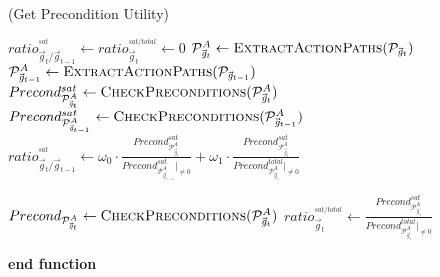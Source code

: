 \documentclass{article}
\begin{document}
\begin{algorithm}
	\caption{(Get Precondition Utility)}
	\label{array-sum}
	\begin{algorithmic}[1]
			\Statex
			\State $ratio_{{\vec{\mathit{g}}_{t}}/\vec{\mathit{g}}_{t-1}}^{^{sat}} \gets
			ratio_{\vec{\mathit{g}}_{t}}^{^{sat/total}} \gets 0$
			\Statex
			\State $\mathcal{P}_{\vec{\mathit{g}}_{t}}^A \gets \Call{ExtractActionPaths}
			{\mathcal{P}_{\vec{\mathit{g}}_{t}}}$
			\Statex
					\Statex
					\State $\mathcal{P}_{\vec{\mathit{g}}_{t-1}}^A \gets
					\Call{ExtractActionPaths} {\mathcal{P}_{\vec{\mathit{g}}_{t-1}}}$
					\Statex
					\State $Precond_{\mathcal{P}_{\vec{\mathit{g}}_{t}}^A}^{sat} \gets
					\Call{CheckPreconditions}{\mathcal{P}_{\vec{\mathit{g}}_{t}}^A}$
					\State $Precond_{\mathcal{P}_{\vec{\mathit{g}}_{t-1}}^A}^{sat} \gets
					\Call{CheckPreconditions}{\mathcal{P}_{\vec{\mathit{g}}_{t-1}}^A}$
					\Statex
					\State $ratio_{{\vec{\mathit{g}}_{t}}/\vec{\mathit{g}}_{t-1}}^{^{sat}} \gets
					\omega_{0}\cdot\frac{Precond_{\mathcal{P}_{\vec{\mathit{g}}_{t}}^A}^{sat}}
					{Precond_{\mathcal{P}_{\vec{\mathit{g}}_{t-1}}^A}^{sat}|_{\neq 0}} +
					\omega_{1}\cdot\frac{Precond_{\mathcal{P}_{\vec{\mathit{g}}_{t}}^A}^{sat}}
					{Precond_{\mathcal{P}_{\vec{\mathit{g}}_{t}}^A}^{total}|_{\neq 0}}$
					
					\State {}
				\Else
					\State {}
				\EndIf
			\Else
					\State $Precond_{\mathcal{P}_{\vec{\mathit{g}}_{t}}^A} \gets
					\Call{CheckPreconditions}{\mathcal{P}_{\vec{\mathit{g}}_{t}}^A}$
					\Statex
					\State $ratio_{\vec{\mathit{g}}_{t}}^{^{sat/total}} \gets
					\frac{Precond_{\mathcal{P}_{\vec{\mathit{g}}_{t}}^A}^{sat}}
					{Precond_{\mathcal{P}_{\vec{\mathit{g}}_{t}}^A}^{total}|_{\neq 0}}$
					
					\State {}
				\Else
					\State {}
				\EndIf
			\EndIf
		\EndFunction 
	\State \textbf{end function}
	\end{algorithmic}
\end{algorithm}
\end{document}
